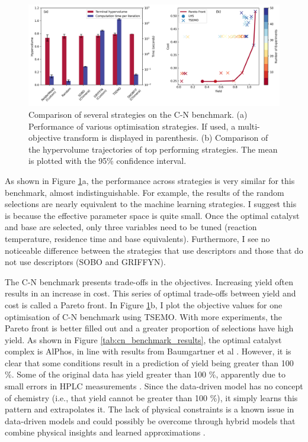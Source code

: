 \begin{figure}
    \centering
    \includegraphics[width=1.2\textwidth]{gfx/Chapter03/cn_hv_time_tradeoff.png}
    \caption{Comparison of several strategies on the C-N benchmark. (a) Performance of various optimisation strategies. If used, a multi-objective transform is displayed in parenthesis. (b) Comparison of the hypervolume trajectories of top performing strategies. The mean is plotted with the 95\% confidence interval.}
    \label{fig:cn_hv_time}
\end{figure}

As shown in Figure \ref{fig:cn_hv_time}a, the performance across strategies is very similar for this benchmark, almost indistinguishable. For example, the results of the random selections are nearly equivalent to the machine learning strategies. I suggest this is because the effective parameter space is quite small. Once the optimal catalyst and base are selected, only three variables need to be tuned (reaction temperature, residence time and base equivalents). Furthermore, I see no noticeable difference between the strategies that use descriptors and those that do not use descriptors (SOBO and GRIFFYN).

The C-N benchmark presents trade-offs in the objectives. Increasing yield often results in an increase in cost. This series of optimal trade-offs between yield and cost is called a Pareto front. In Figure \ref{fig:cn_hv_time}b, I plot the objective values for one optimisation of C-N benchmark using TSEMO. With more experiments, the Pareto front is better filled out and a greater proportion of selections have high yield. As shown in Figure \ref{tab:cn_benchmark_results}, the optimal catalyst complex is AlPhos, in line with results from Baumgartner et al \cite{Baumgartner2019}. However, it is clear that some conditions result in a prediction of yield being greater than 100 \%. Some of the original data has yield greater than 100 \%, apparently due to small errors in HPLC measurements \cite{Baumgartner2019}. Since the data-driven model has no concept of chemistry (i.e., that yield cannot be greater than 100 \%), it simply learns this pattern and extrapolates it. The lack of physical constraints is a known issue in data-driven models and could possibly be overcome through hybrid models that combine physical insights and learned approximations \cite{Thompson1994, Tsay2019}.

